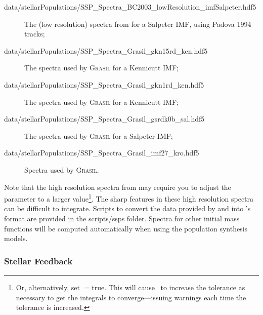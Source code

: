 \begin{description}
 \item [{\normalfont \ttfamily data/stellarPopulations/SSP\_Spectra\_BC2003\_lowResolution\_imfSalpeter.hdf5}] The (low resolution) spectra from \cite{bruzual_stellar_2003} for a Salpeter IMF, using Padova 1994 tracks;
 \item [{\normalfont \ttfamily data/stellarPopulations/SSP\_Spectra\_Grasil\_gkn15rd\_ken.hdf5}] The spectra used by {\normalfont \scshape Grasil} for a Kennicutt IMF;
 \item [{\normalfont \ttfamily data/stellarPopulations/SSP\_Spectra\_Grasil\_gkn1rd\_ken.hdf5}] The spectra used by {\normalfont \scshape Grasil} for a Kennicutt IMF;
 \item [{\normalfont \ttfamily data/stellarPopulations/SSP\_Spectra\_Grasil\_gsrdk0b\_sal.hdf5}] The spectra used by {\normalfont \scshape Grasil} for a Salpeter IMF;
 \item [{\normalfont \ttfamily data/stellarPopulations/SSP\_Spectra\_Grasil\_imf27\_kro.hdf5}] Spectra used by {\normalfont \scshape Grasil}.
\end{description}
Note that the high resolution spectra from \cite{bruzual_stellar_2003} may require you to adjust the {\normalfont \ttfamily [stellarPopulationLuminosityIntegrationToleranceRelative]} parameter to a larger value\footnote{Or, alternatively, set {\normalfont \ttfamily [stellarPopulationLuminosityIntegrationToleranceDegrade]}$=${\normalfont \ttfamily true}. This will cause \glc\ to increase the tolerance as necessary to get the integrals to converge---issuing warnings each time the tolerance is increased.}. The sharp features in these high resolution spectra can be difficult to integrate. Scripts to convert the data provided by \cite{maraston_evolutionary_2005} and \cite{bruzual_stellar_2003} into \glc's format are provided in the {\normalfont \ttfamily scripts/ssps} folder. Spectra for other initial mass functions will be computed automatically when using the \cite{conroy_propagation_2009} population synthesis models.

\subsubsection{Stellar Feedback}


